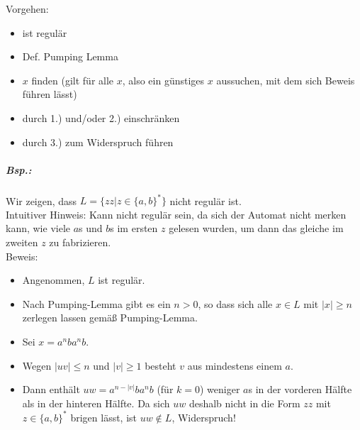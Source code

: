 \documentclass{scrreprt}
\begin{document}
Vorgehen:
\begin{itemize}
\item ist regulär
\item Def. Pumping Lemma
\item $x$ finden (gilt für alle $x$, also ein günstiges $x$ aussuchen, mit dem sich Beweis führen lässt)
\item durch 1.) und/oder 2.) einschränken
\item durch 3.) zum Widerspruch führen
\end{itemize}

\subparagraph{Bsp.:} Wir zeigen, dass $L=\{zz|z\in \{a,b\}^*\}$ nicht regulär ist.\\
Intuitiver Hinweis: Kann nicht regulär sein, da sich der Automat nicht merken kann, wie viele $a$s und $b$s im ersten $z$ gelesen wurden, um dann das gleiche im zweiten $z$ zu fabrizieren.\\
Beweis: 
\begin{itemize}
\item Angenommen, $L$ ist regulär.
\item Nach Pumping-Lemma gibt es ein $n>0$, so dass sich alle $x \in L$ mit $|x|\geq n$ zerlegen lassen gemäß Pumping-Lemma.
\item Sei $x=a^nb a^nb$.
\item Wegen $|uv|\leq n$ und $|v|\geq 1$ besteht $v$ aus mindestens einem $a$.\\
\item Dann enthält $uw=a^{n-|v|}ba^nb$ (für $k=0$) weniger $a$s in der vorderen Hälfte als in der hinteren Hälfte. Da sich $uw$ deshalb nicht in die Form $zz$ mit $z\in \{a,b\}^*$ brigen lässt, ist $uw \not \in L$, Widerspruch!
\end{itemize}
\end{document}
